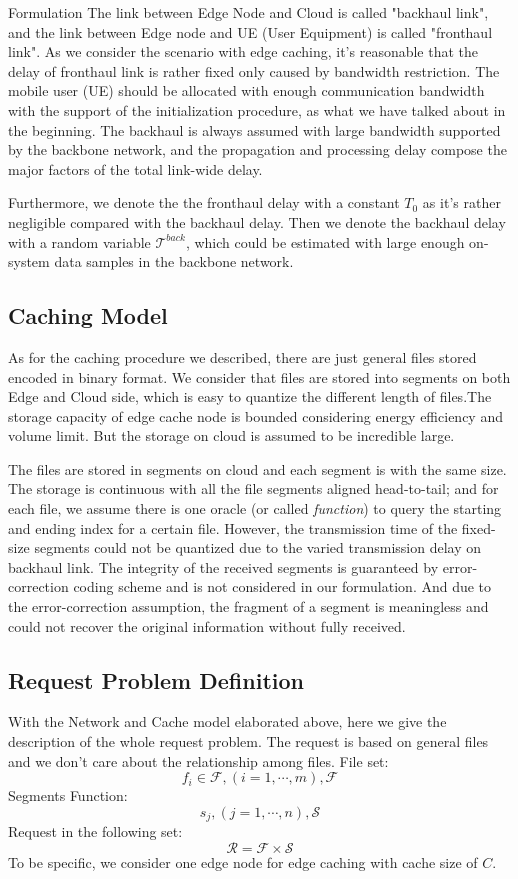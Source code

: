 \documentclass{article}
\begin{document}
\begin{section}{Formulation}
    The link between Edge Node and Cloud is called "backhaul link", and the link between Edge node and UE (User Equipment) is called "fronthaul link".
    As we consider the scenario with edge caching, it's reasonable that the delay of fronthaul link is rather fixed only caused by bandwidth restriction. The mobile user (UE) should be allocated with enough communication bandwidth with the support of the initialization procedure, as what we have talked about in the beginning. The backhaul is always assumed with large bandwidth supported by the backbone network, and the propagation and processing delay compose the major factors of the total link-wide delay.

    Furthermore, we denote the the fronthaul delay with a constant $T_0$ as it's rather negligible compared with the backhaul delay. Then we denote the backhaul delay with a random variable $\mathcal{T}^{back}$, which could be estimated with large enough on-system data samples in the backbone network.
    
    \subsection{Caching Model}
    As for the caching procedure we described, there are just general files stored encoded in binary format. We consider that files are stored into segments on both Edge and Cloud side, which is easy to quantize the different length of files.The storage capacity of edge cache node is bounded considering energy efficiency and volume limit. But the storage on cloud is assumed to be incredible large.
    
    The files are stored in segments on cloud and each segment is with the same size. The storage is continuous with all the file segments aligned head-to-tail; and for each file, we assume there is one oracle (or called \textit{function}) to query the starting and ending index for a certain file.
    However, the transmission time of the fixed-size segments could not be quantized due to the varied transmission delay on backhaul link. The integrity of the received segments is guaranteed by error-correction coding scheme and is not considered in our formulation. And due to the error-correction assumption, the fragment of a segment is meaningless and could not recover the original information without fully received.

    \subsection{Request Problem Definition}
    With the Network and Cache model elaborated above, here we give the description of the whole request problem.
    The request is based on general files and we don't care about the relationship among files.
    File set:
    $$
    f_i\in\mathcal{F},(i=1,\cdots,m), \mathcal{F}
    $$
    Segments Function:
    $$
    s_j,(j=1,\cdots,n), \mathcal{S}
    $$
    Request in the following set:
    $$
    \mathcal{R}=\mathcal{F}\times\mathcal{S}
    $$
    To be specific, we consider one edge node for edge caching with cache size of $C$.


\end{section}
\end{document}
